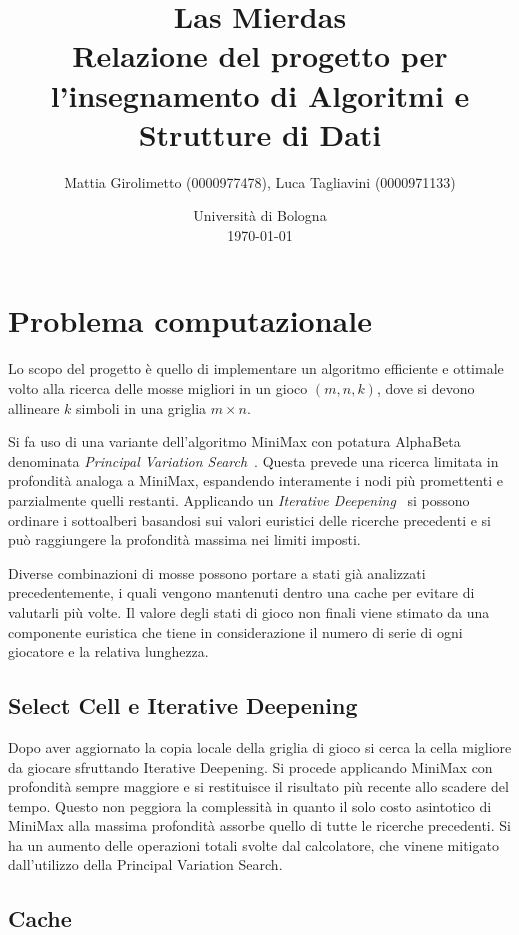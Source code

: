\documentclass{article}
\title{Las Mierdas \\
\large Relazione del progetto per l'insegnamento di Algoritmi e Strutture di Dati}
\author{
  Mattia Girolimetto (0000977478),
  Luca Tagliavini (0000971133)
}
\date{
	Universit\`a di Bologna \\
  \today
}
\begin{document}
\maketitle

\section*{Problema computazionale}

Lo scopo del progetto \`e quello di implementare un algoritmo efficiente e ottimale
volto alla ricerca delle mosse migliori in un gioco $(m,n,k)$, dove si devono
allineare $k$ simboli in una griglia $m \times n$.

Si fa uso di una variante dell'algoritmo MiniMax con potatura
AlphaBeta denominata \emph{Principal Variation Search}~\cite{negascout}. Questa
prevede  una ricerca limitata in profondit\`a analoga a MiniMax, espandendo 
interamente i nodi pi\`u promettenti e parzialmente quelli restanti. Applicando
un \emph{Iterative Deepening}~\cite{id} si possono ordinare i sottoalberi
basandosi sui valori euristici delle ricerche precedenti e si pu\`o raggiungere
la profondit\`a massima nei limiti imposti.

Diverse combinazioni di mosse possono portare a stati gi\`a analizzati
precedentemente, i quali vengono mantenuti dentro una cache per evitare di
valutarli pi\`u volte. Il valore degli stati di gioco non finali viene stimato
da una componente euristica che tiene in considerazione il numero di serie di
ogni giocatore e la relativa lunghezza.

\subsection*{Select Cell e Iterative Deepening}

Dopo aver aggiornato la copia locale della griglia di gioco si cerca la cella
migliore da giocare sfruttando Iterative Deepening. Si procede applicando
MiniMax con profondit\`a sempre maggiore e si restituisce il risultato pi\`u
recente allo scadere del tempo. Questo non peggiora la complessit\`a in quanto
il solo costo asintotico di MiniMax alla massima profondit\`a assorbe quello
di tutte le ricerche precedenti. Si ha un aumento delle operazioni totali svolte
dal calcolatore, che vinene mitigato dall'utilizzo della Principal Variation Search.

\subsection*{Cache}
\end{document}
